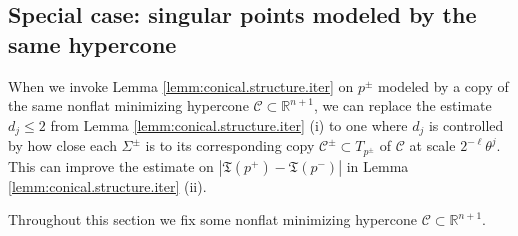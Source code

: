 \documentclass[11pt, letterpaper, reqno]{amsart}
\numberwithin{equation}{section}
\theoremstyle{remark}
\newcommand{\RR}{\mathbb{R}}
\newcommand{\cC}{\mathcal{C}}
\newcommand{\frT}{\mathfrak{T}}
\begin{document}
\subsection{Special case: singular points modeled by the same hypercone}

When we invoke Lemma \ref{lemm:conical.structure.iter} on $p^\pm$ modeled by a copy of the same nonflat minimizing hypercone $\cC \subset \RR^{n+1}$, we can replace the estimate $d_j \leq 2$ from Lemma \ref{lemm:conical.structure.iter} (i) to one where $d_j$ is controlled by how close each $\Sigma^\pm$ is to its corresponding copy $\cC^\pm \subset T_{p^\pm}$ of $\cC$ at scale $2^{-\ell} \theta^j$. This can improve the estimate on $|\frT(p^+) - \frT(p^-)|$ in Lemma \ref{lemm:conical.structure.iter} (ii).

Throughout this section we fix some nonflat minimizing hypercone $\cC \subset \RR^{n+1}$. 
\end{document}
